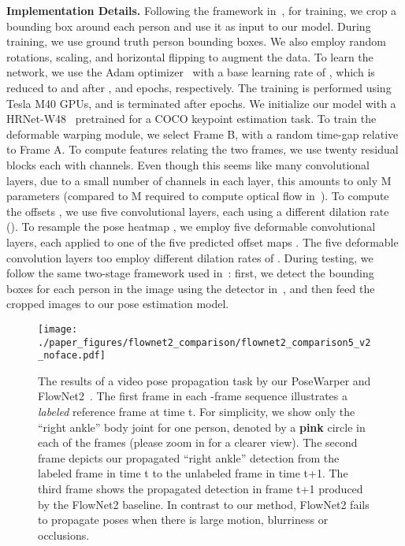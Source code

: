 \documentclass{article}
\begin{document}
\textbf{Implementation Details.} Following the framework in~\cite{sun2019deep}, for training, we crop a  bounding box around each person and use it as input to our model. During training, we use ground truth person bounding boxes. We also employ random rotations, scaling, and horizontal flipping to augment the data. To learn the network, we use the Adam optimizer~\cite{DBLP:journals/corr/KingmaB14} with a base learning rate of , which is reduced to  and  after , and  epochs, respectively. The training is performed using  Tesla M40 GPUs, and is terminated after  epochs. We initialize our model with a HRNet-W48~\cite{sun2019deep} pretrained for a COCO keypoint estimation task. To train the deformable warping module, we select Frame B, with a random time-gap  relative to Frame A. To compute features relating the two frames, we use twenty  residual blocks each with  channels. Even though this seems like many convolutional layers, due to a small number of channels in each layer, this amounts to only M parameters (compared to M required to compute optical flow in~\cite{DBLP:journals/corr/IlgMSKDB16}). To compute the offsets \smash{}, we use five  convolutional layers, each using a different dilation rate (). To resample the pose heatmap \smash{}, we employ five  deformable convolutional layers, each applied to one of the five predicted offset maps \smash{}. The five deformable convolution layers too employ different dilation rates of . During testing, we follow the same two-stage framework used in~\cite{sun2019deep,xiao2018simple}: first, we detect the bounding boxes for each person in the image using the detector in~\cite{girdhar2018detecttrack}, and then feed the cropped images to our pose estimation model. 



\begin{figure}
\begin{center}
   \texttt{[image: ./paper\_figures/flownet2\_comparison/flownet2\_comparison5\_v2\_noface.pdf]}
\end{center}
\vspace{-0.1cm}
   \caption{The results of a video pose propagation task by our PoseWarper and FlowNet2~\cite{DBLP:journals/corr/IlgMSKDB16}. The first frame in each -frame sequence illustrates a {\em labeled} reference frame at time t. For simplicity, we show only the ``right ankle'' body joint for one person, denoted by a \textbf{{\color{RubineRed} pink}} circle in each of the frames (please zoom in for a clearer view). The second frame depicts our propagated ``right ankle'' detection from the labeled frame in time t to the unlabeled frame in time t+1. The third frame shows the propagated detection in frame t+1 produced by the FlowNet2 baseline. In contrast to our method, FlowNet2 fails to propagate poses when there is large motion, blurriness or occlusions.\vspace{-0.3cm}}
\label{flownet2_comparison_fig}
\end{figure}
\end{document}
